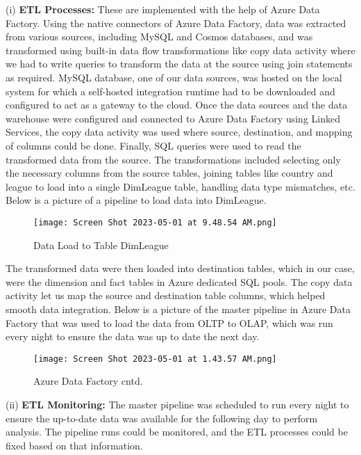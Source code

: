 \documentclass[lettersize]{IEEEtran}
\begin{document}
\vspace{0.5em}(i) \textbf{ETL Processes: } These are implemented with the help of Azure Data Factory. Using the native connectors of Azure Data Factory, data was extracted from various sources, including MySQL and Cosmos databases, and was transformed using built-in data flow transformations like copy data activity where we had to write queries to transform the data at the source using join statements as required. MySQL database, one of our data sources, was hosted on the local system for which a self-hosted integration runtime had to be downloaded and configured to act as a gateway to the cloud. Once the data sources and the data warehouse were configured and connected to Azure Data Factory using Linked Services, the copy data activity was used where source, destination, and mapping of columns could be done. Finally, SQL queries were used to read the transformed data from the source. The transformations included selecting only the necessary columns from the source tables, joining tables like country and league to load into a single DimLeague table, handling data type mismatches, etc.
Below is a picture of a pipeline to load data into DimLeague.
\vspace{-\baselineskip}
\begin{figure}[H]
    \centering
    \texttt{[image: Screen Shot 2023-05-01 at 9.48.54 AM.png]}
    \caption{Data Load to Table DimLeague}
    \label{fig:image_label}
\end{figure}

The transformed data were then loaded into destination tables, which in our case, were the dimension and fact tables in Azure dedicated SQL pools. The copy data activity let us map the source and destination table columns, which helped smooth data integration. Below is a picture of the master pipeline in Azure Data Factory that was used to load the data from OLTP to OLAP, which was run every night to ensure the data was up to date the next day.

\begin{figure}[H]
    \centering
    \texttt{[image: Screen Shot 2023-05-01 at 1.43.57 AM.png]}
    \caption{Azure Data Factory cntd.}
    \label{fig:image_label}
\end{figure}

(ii) \textbf{ETL Monitoring: }The master pipeline was scheduled to run every night to ensure the up-to-date data was available for the following day to perform analysis. The pipeline runs could be monitored, and the ETL processes could be fixed based on that information.\
\end{document}
